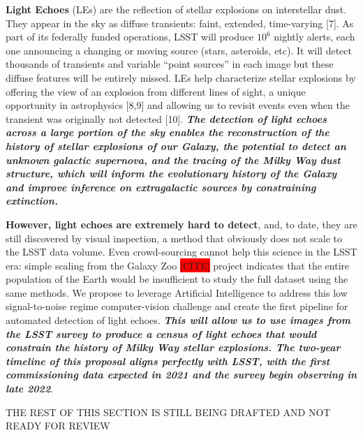 \documentclass{proposalnsf}
\newcommand{\ana}[1]{\colorbox{red}{#1}}
\begin{document}
{\bf Light Echoes} (LEs) are the reflection of stellar explosions on interstellar dust. They appear in the sky as diffuse transients: faint, extended, time-varying [7]. 
As part of its federally funded operations, LSST will produce $10^6$ nightly alerts, each one announcing a changing or moving source (stars, asteroids, etc).  It will detect thousands of transients and variable “point sources” in each image but these diffuse features will be entirely missed.  LEs help characterize stellar explosions by offering the view of an explosion from different lines of sight, a unique opportunity in astrophysics [8,9] 
 and allowing us to revisit events even when the transient was originally not detected [10]. 
{\bf\emph{ The detection of light echoes across a large portion of the sky enables the reconstruction of the history of stellar explosions of our Galaxy, the potential to detect an unknown galactic supernova, and the tracing of the Milky Way dust structure, which will inform the evolutionary history of the Galaxy and improve inference on extragalactic sources by constraining extinction. }}


{\bf However, light echoes are extremely hard to detect}, and, to date, they are still discovered by visual inspection, a method that obviously does not scale to the LSST data volume.  Even crowd-sourcing cannot help this science in the LSST era: simple scaling from the Galaxy Zoo \ana{[CITE]} project indicates that the entire population of the Earth would be insufficient to study the full dataset using the same methods.  We propose to leverage Artificial Intelligence to address this low signal-to-noise regime computer-vision challenge and create the first pipeline for automated detection of light echoes.  {\bf \emph{This will allow us to use images from the LSST survey to produce a census of light echoes that would constrain the history of Milky Way stellar explosions.  The two-year timeline of this proposal aligns perfectly with LSST, with the first commissioning data expected in 2021 and the survey begin observing in late 2022}}.



{\LARGE{THE REST OF THIS SECTION  IS STILL BEING DRAFTED AND NOT READY FOR REVIEW}}
\end{document}
